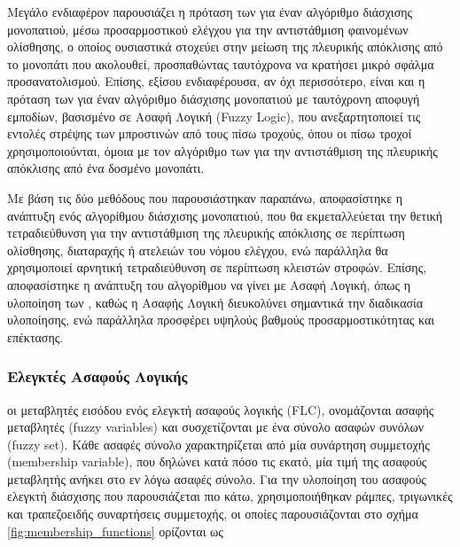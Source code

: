 \bigskip
Μεγάλο ενδιαφέρον παρουσιάζει η πρόταση των \citeauthor{offroad_adaptive_control} \cite{offroad_adaptive_control} για έναν αλγόριθμο διάσχισης μονοπατιού, μέσω προσαρμοστικού ελέγχου για την αντιστάθμιση φαινομένων ολίσθησης, ο οποίος ουσιαστικά στοχεύει στην μείωση της πλευρικής απόκλισης από το μονοπάτι που ακολουθεί, προσπαθώντας ταυτόχρονα να κρατήσει μικρό σφάλμα προσανατολισμού. Επίσης, εξίσου ενδιαφέρουσα, αν όχι περισσότερο, είναι και η πρόταση των \citeauthor{reactive_fuzzy_ptc} \cite{reactive_fuzzy_ptc} για έναν αλγόριθμο διάσχισης μονοπατιού με ταυτόχρονη αποφυγή εμποδίων, βασισμένο σε Ασαφή Λογική (Fuzzy Logic), που ανεξαρτητοποιεί τις εντολές στρέψης των μπροστινών από τους πίσω τροχούς, όπου οι πίσω τροχοί χρησιμοποιούνται, όμοια με τον αλγόριθμο των \cite{offroad_adaptive_control} \cite{offroad_adaptive_control} για την αντιστάθμιση της πλευρικής απόκλισης από ένα δοσμένο μονοπάτι.

\bigskip
Με βάση τις δύο μεθόδους που παρουσιάστηκαν παραπάνω, αποφασίστηκε η ανάπτυξη ενός αλγορίθμου διάσχισης μονοπατιού, που θα εκμεταλλεύεται την θετική τετραδιεύθυνση για την αντιστάθμιση της πλευρικής απόκλισης σε περίπτωση ολίσθησης, διαταραχής ή ατελειών του νόμου ελέγχου, ενώ παράλληλα θα χρησιμοποιεί αρνητική τετραδιεύθυνση σε περίπτωση κλειστών στροφών. Επίσης, αποφασίστηκε η ανάπτυξη του αλγορίθμου να γίνει με Ασαφή Λογική, όπως η υλοποίηση των \citeauthor{reactive_fuzzy_ptc} \cite{reactive_fuzzy_ptc}, καθώς η Ασαφής Λογική διευκολύνει σημαντικά την διαδικασία υλοποίησης, ενώ παράλληλα προσφέρει υψηλούς βαθμούς προσαρμοστικότητας και επέκτασης.

\subsubsection{Ελεγκτές Ασαφούς Λογικής} %
οι μεταβλητές εισόδου ενός ελεγκτή ασαφούς λογικής (FLC), ονομάζονται ασαφής μεταβλητές (fuzzy variables) και συσχετίζονται με ένα σύνολο ασαφών συνόλων (fuzzy set). Κάθε ασαφές σύνολο χαρακτηρίζεται από μία συνάρτηση συμμετοχής (membership variable), που δηλώνει κατά πόσο τις εκατό, μία τιμή της ασαφούς μεταβλητής ανήκει στο εν λόγω ασαφές σύνολο. Για την υλοποίηση του ασαφούς ελεγκτή διάσχισης που παρουσιάζεται πιο κάτω, χρησιμοποιήθηκαν ράμπες, τριγωνικές και τραπεζοειδής συναρτήσεις συμμετοχής, οι οποίες παρουσιάζονται στο σχήμα \ref{fig:membership_functions} ορίζονται ως

